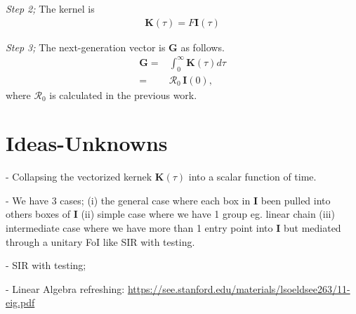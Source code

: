 \documentclass[12pt]{article}
\DeclareRobustCommand\_{\ifmmode\expandafter\subtxt\else\textunderscore\fi}
\newcommand{\R}{\ensuremath{\mathcal{R}_0}}
\renewcommand{\vec}[1]{\ensuremath{\mathbf{#1}}} %
\theoremstyle{definition} %
\begin{document}
{\it Step 2;} The kernel is
\begin{align}
\vec K(\tau)= F \vec I(\tau)
\end{align}

{\it Step 3;} The next-generation vector is $\vec G$ as follows.
\begin{align}
\vec G=&\int_0^\infty \vec K(\tau) d\tau\\
=& \R\, \vec I(0), 
\end{align}
where $\R$ is calculated in the previous work.
\section{Ideas-Unknowns}
- Collapsing the vectorized kernek $\vec K(\tau)$ into a scalar function of time.

- We have 3 cases; (i) the general case where each box in $\vec I$ been pulled into others boxes of $\vec I$  (ii) simple case where we have 1 group eg. linear chain (iii) intermediate case where we have more than 1 entry point into $\vec I$ but mediated through a unitary FoI like SIR with testing. 

- SIR with testing; 

- Linear Algebra refreshing: \url{https://see.stanford.edu/materials/lsoeldsee263/11-eig.pdf}


\end{document}
